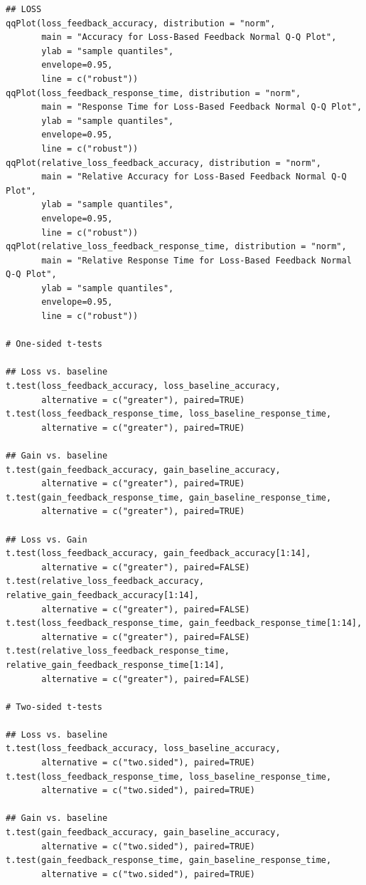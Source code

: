 \documentclass[12pt]{exam}
\begin{document}
\begin{verbatim}
## LOSS
qqPlot(loss_feedback_accuracy, distribution = "norm", 
       main = "Accuracy for Loss-Based Feedback Normal Q-Q Plot",
       ylab = "sample quantiles",
       envelope=0.95,
       line = c("robust"))
qqPlot(loss_feedback_response_time, distribution = "norm", 
       main = "Response Time for Loss-Based Feedback Normal Q-Q Plot",
       ylab = "sample quantiles",
       envelope=0.95,
       line = c("robust"))
qqPlot(relative_loss_feedback_accuracy, distribution = "norm", 
       main = "Relative Accuracy for Loss-Based Feedback Normal Q-Q Plot",
       ylab = "sample quantiles",
       envelope=0.95,
       line = c("robust"))
qqPlot(relative_loss_feedback_response_time, distribution = "norm", 
       main = "Relative Response Time for Loss-Based Feedback Normal Q-Q Plot",
       ylab = "sample quantiles",
       envelope=0.95,
       line = c("robust"))

# One-sided t-tests

## Loss vs. baseline
t.test(loss_feedback_accuracy, loss_baseline_accuracy,
       alternative = c("greater"), paired=TRUE)
t.test(loss_feedback_response_time, loss_baseline_response_time,
       alternative = c("greater"), paired=TRUE)

## Gain vs. baseline
t.test(gain_feedback_accuracy, gain_baseline_accuracy,
       alternative = c("greater"), paired=TRUE)
t.test(gain_feedback_response_time, gain_baseline_response_time,
       alternative = c("greater"), paired=TRUE)

## Loss vs. Gain
t.test(loss_feedback_accuracy, gain_feedback_accuracy[1:14], 
       alternative = c("greater"), paired=FALSE)
t.test(relative_loss_feedback_accuracy, relative_gain_feedback_accuracy[1:14], 
       alternative = c("greater"), paired=FALSE)
t.test(loss_feedback_response_time, gain_feedback_response_time[1:14], 
       alternative = c("greater"), paired=FALSE)
t.test(relative_loss_feedback_response_time, relative_gain_feedback_response_time[1:14], 
       alternative = c("greater"), paired=FALSE)

# Two-sided t-tests

## Loss vs. baseline
t.test(loss_feedback_accuracy, loss_baseline_accuracy,
       alternative = c("two.sided"), paired=TRUE)
t.test(loss_feedback_response_time, loss_baseline_response_time,
       alternative = c("two.sided"), paired=TRUE)

## Gain vs. baseline
t.test(gain_feedback_accuracy, gain_baseline_accuracy,
       alternative = c("two.sided"), paired=TRUE)
t.test(gain_feedback_response_time, gain_baseline_response_time,
       alternative = c("two.sided"), paired=TRUE)


\end{verbatim}
\end{document}
